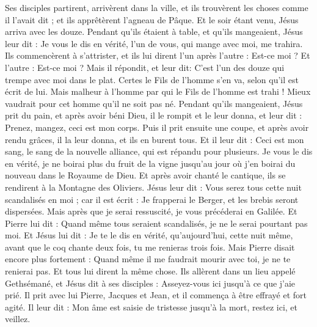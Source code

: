 \begin{multicols}{2}
Ses disciples partirent, arrivèrent dans la ville, et ils trouvèrent les choses comme il l’avait dit ; et ils apprêtèrent l'agneau de Pâque.
Et le soir étant venu, Jésus arriva avec les douze.
Pendant qu’ils étaient à table, et qu'ils mangeaient, Jésus leur dit : Je vous le dis en vérité, l'un de vous, qui mange avec moi, me trahira.
Ils commencèrent à s'attrister, et ils lui dirent l’un après l’autre : Est-ce moi ? Et l’autre : Est-ce moi ?
Mais il répondit, et leur dit: C'est l'un des douze qui trempe avec moi dans le plat.
Certes le Fils de l'homme s'en va, selon qu'il est écrit de lui. Mais malheur à l'homme par qui le Fils de l'homme est trahi ! Mieux vaudrait pour cet homme qu’il ne soit pas né.
Pendant qu’ils mangeaient, Jésus prit du pain, et après avoir béni Dieu, il le rompit et le leur donna, et leur dit : Prenez, mangez, ceci est mon corps.
Puis il prit ensuite une coupe, et après avoir rendu grâces, il la leur donna, et ils en burent tous.
Et il leur dit : Ceci est mon sang, le sang de la nouvelle alliance, qui est répandu pour plusieurs.
Je vous le dis en vérité, je ne boirai plus du fruit de la vigne jusqu'au jour où j’en boirai du nouveau dans le Royaume de Dieu.
Et après avoir chanté le cantique, ils se rendirent à la Montagne des Oliviers.
Jésus leur dit : Vous serez tous cette nuit scandalisés en moi ; car il est écrit : Je frapperai le Berger, et les brebis seront dispersées.
Mais après que je serai ressuscité, je vous précéderai en Galilée.
Et Pierre lui dit : Quand même tous seraient scandalisés, je ne le serai pourtant pas moi.
Et Jésus lui dit : Je te le dis en vérité, qu'aujourd'hui, cette nuit même, avant que le coq chante deux fois, tu me renieras trois fois.
Mais Pierre disait encore plus fortement : Quand même il me faudrait mourir avec toi, je ne te renierai pas. Et tous lui dirent la même chose.
Ils allèrent dans un lieu appelé Gethsémané, et Jésus dit à ses disciples : Asseyez-vous ici jusqu'à ce que j’aie prié.
Il prit avec lui Pierre, Jacques et Jean, et il commença à être effrayé et fort agité.
Il leur dit : Mon âme est saisie de tristesse jusqu’à la mort, restez ici, et veillez.

\end{multicols}
